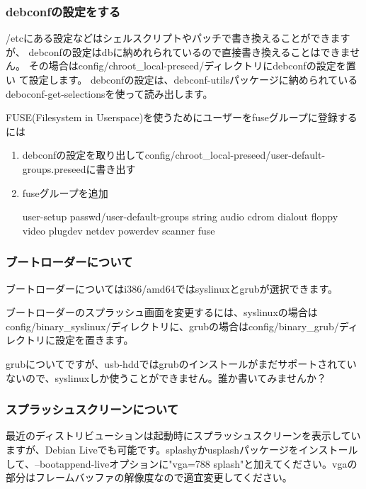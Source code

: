 \documentclass[mingoth,a4paper]{jsarticle}
\begin{document}
\subsubsection{debconfの設定をする}
/etcにある設定などはシェルスクリプトやパッチで書き換えることができますが、
debconfの設定はdbに納めれられているので直接書き換えることはできません。
その場合はconfig/chroot\_local-preseed/ディレクトリにdebconfの設定を置い
て設定します。
debconfの設定は、debconf-utilsパッケージに納められているdeboconf-get-selectionsを使って読み出します。

\newpage

FUSE(Filesystem in Userspace)を使うためにユーザーをfuseグループに登録するには

\begin{enumerate}
 \item debconfの設定を取り出してconfig/chroot\_local-preseed/user-default-groups.preseedに書き出す
 \item fuseグループを追加
 \begin{commandline}
 user-setup      passwd/user-default-groups      string  audio cdrom dialout floppy video plugdev netdev powerdev scanner fuse
 \end{commandline}
\end{enumerate}

\subsubsection{ブートローダーについて}
ブートローダーについてはi386/amd64ではsyslinuxとgrubが選択できます。

ブートローダーのスプラッシュ画面を変更するには、syslinuxの場合はconfig/binary\_syslinux/ディレクトリに、grubの場合はconfig/binary\_grub/ディレクトリに設定を置きます。

grubについてですが、usb-hddではgrubのインストールがまだサポートされていないので、syslinuxしか使うことができません。誰か書いてみませんか？

\subsubsection{スプラッシュスクリーンについて}
最近のディストリビューションは起動時にスプラッシュスクリーンを表示していますが、Debian Liveでも可能です。splashyかusplashパッケージをインストールして、--bootappend-liveオプションに"vga=788 splash"と加えてください。vgaの部分はフレームバッファの解像度なので適宜変更してください。
\end{document}
